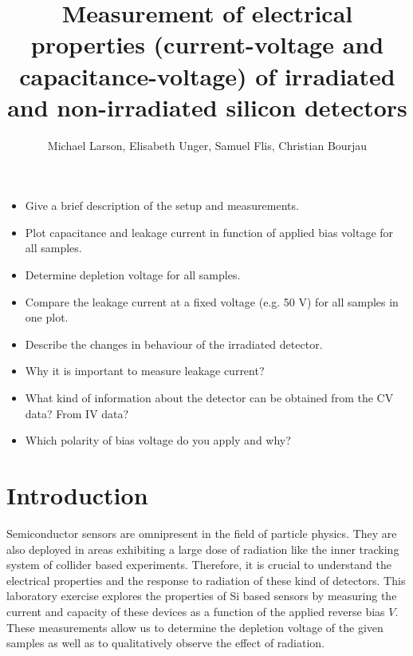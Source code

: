 \documentclass[11pt]{article}
\title{Measurement of electrical properties (current-voltage and capacitance-voltage) of irradiated and non-irradiated silicon detectors}
\author{Michael Larson, Elisabeth Unger, Samuel Flis, Christian Bourjau}
\begin{document}
\maketitle
\begin{itemize}
\item Give a brief description of the setup and measurements.
\item Plot capacitance and leakage current in function of applied bias voltage for all samples.
\item Determine depletion voltage for all samples.
\item Compare the leakage current at a fixed voltage (e.g. 50 V) for all samples in one plot.
\item Describe the changes in behaviour of the irradiated detector.
\item Why it is important to measure leakage current?
\item What kind of information about the detector can be obtained from the CV data? From IV data?
\item Which polarity of bias voltage do you apply and why?
\end{itemize}

\section{Introduction}
\label{sec:introduction}

Semiconductor sensors are omnipresent in the field of particle physics.
They are also deployed in areas exhibiting a large dose of radiation like the inner tracking system of collider based experiments.
Therefore, it is crucial to understand the electrical properties and the response to radiation of these kind of detectors.
This laboratory exercise explores the  properties of Si based sensors by measuring the current and capacity of these devices as a function of the applied reverse bias $V$.
These measurements allow us to determine the depletion voltage of the given samples as well as to qualitatively observe the effect of radiation.
\end{document}
